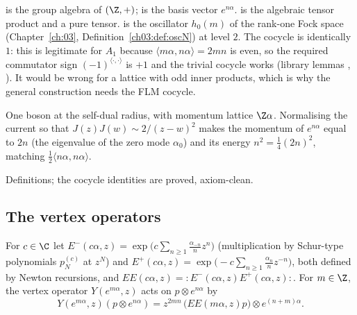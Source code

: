 \begin{dictionary}
 is the group algebra of $(\Z,+)$;  is the basis vector $e^{n\alpha}$.
 is the algebraic tensor product and  a pure tensor.  is the oscillator
$h_0(m)$ of the rank-one Fock space  (Chapter~\ref{ch:03}, Definition~\ref{ch03:def:oscN}) at level
\textbf{$2$}. The cocycle is identically $1$: this is legitimate for $A_1$ because $\langle m\alpha,n\alpha\rangle=2mn$
is even, so the required commutator sign $(-1)^{\langle\cdot,\cdot\rangle}$ is $+1$ and the trivial cocycle works
(library lemmas , ). It would be wrong for a lattice with odd inner
products, which is why the general construction needs the FLM cocycle.
\end{dictionary}

\begin{physics}
One boson at the self-dual radius, with momentum lattice $\Z\alpha$. Normalising the current so that
$J(z)J(w)\sim2/(z-w)^2$ makes the momentum of $e^{n\alpha}$ equal to $2n$ (the eigenvalue of the zero mode
$\alpha_0$) and its energy $n^2=\frac14(2n)^2$, matching $\frac12\langle n\alpha,n\alpha\rangle$.
\end{physics}

\begin{status}
Definitions; the cocycle identities are proved, axiom-clean.
\end{status}

\subsection{The vertex operators}

\begin{definition}[$Y(e^{m\alpha},z)$]\label{l05:def:Yemalpha}
For $c\in\C$ let $E^-(c\alpha,z)=\exp\big(c\sum_{n\ge1}\frac{\alpha_{-n}}nz^n\big)$ (multiplication by Schur-type
polynomials $p^{(c)}_N$ at $z^N$) and $E^+(c\alpha,z)=\exp\big(-c\sum_{n\ge1}\frac{\alpha_n}nz^{-n}\big)$, both defined
by Newton recursions, and $EE(c\alpha,z)={:}E^-(c\alpha,z)E^+(c\alpha,z){:}$. For $m\in\Z$, the vertex operator
$Y(e^{m\alpha},z)$ acts on $p\otimes e^{n\alpha}$ by
\begin{equation*}
 Y(e^{m\alpha},z)(p\otimes e^{n\alpha})=z^{2mn}\,\big(EE(m\alpha,z)p\big)\otimes e^{(n+m)\alpha}.
\end{equation*}
\end{definition}

